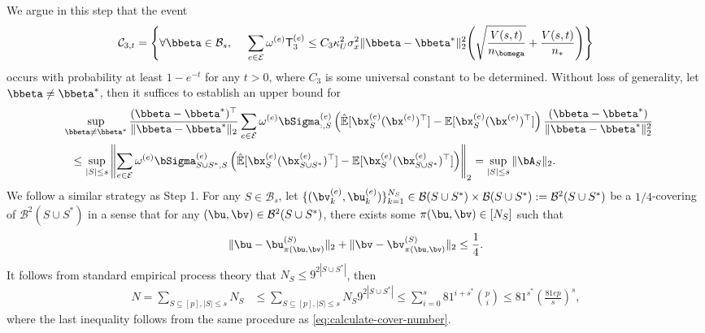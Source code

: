 \documentclass[10pt]{article}
\numberwithin{equation}{section}
\begin{document}
 We argue in this step that the event
\begin{align}
\label{eq:low-dim-id-bound3}
	\mathcal{C}_{3,t} = \left\{ \forall \bbeta \in \mathcal{B}_s, ~~~~ \sum_{e\in \mathcal{E}} \omega^{(e)} \mathsf{T}_3^{(e)} \le C_3\kappa_U^2 \sigma_x^2  \|\bbeta - \bbeta^*\|_2^2 \Bigg(\sqrt{\frac{V(s,t)}{n_{\bomega}}} + \frac{V(s,t)}{n_*}\Bigg) \right\}	
\end{align} occurs with probability at least $1-e^{-t}$ for any $t>0$, where $C_3$ is some universal constant to be determined. Without loss of generality, let $\bbeta \neq \bbeta^*$, then it suffices to establish an upper bound for
\begin{align}
\label{eq:step3-sup-argument-1}
\begin{split}
&~\sup_{\bbeta \neq \bbeta^*} \frac{(\bbeta - \bbeta^*)^\top}{\|\bbeta - \bbeta^*\|_2} \sum_{e\in \mathcal{E}} \omega^{(e)} \bSigma_{:,S}^{(e)} \left(\hat{\mathbb{E}}[\bx_S^{(e)} (\bx^{(e)})^\top] - \mathbb{E}[\bx_S^{(e)} (\bx^{(e)})^\top] \right) \frac{(\bbeta - \bbeta^*)}{\|\bbeta - \bbeta^*\|_2^2} \\
&~~~\le \sup_{|S| \le s} \left\| \sum_{e\in \mathcal{E}} \omega^{(e)} \bSigma_{S\cup S^*,S}^{(e)} \left(\hat{\mathbb{E}}[\bx_S^{(e)} (\bx^{(e)}_{S\cup S^*})^\top] - \mathbb{E}[\bx_S^{(e)} (\bx^{(e)}_{S\cup S^*})^\top] \right) \right\|_2 = \sup_{|S| \le s} \|\bA_S\|_2.
\end{split}
\end{align}
We follow a similar strategy as {\sc Step 1}. For any $S\in \mathcal{B}_s$, let $\{(\bv^{(e)}_{k}, \bu^{(e)}_{k})\}_{k=1}^{N_S} \in \mathcal{B}(S\cup S^*) \times \mathcal{B}(S\cup S^*) := \mathcal{B}^2(S\cup S^*)$ be a $1/4$-covering of $\mathcal{B}^2(S\cup S^*)$ in a sense that for any $(\bu, \bv) \in \mathcal{B}^2(S\cup S^*)$, there exists some $\pi(\bu, \bv) \in [N_S]$ such that
\begin{align*}
    \|\bu - \bu^{(S)}_{\pi(\bu, \bv)}\|_{2} + \|\bv - \bv^{(S)}_{\pi(\bu, \bv)}\|_{2} \le \frac{1}{4}.
\end{align*} It follows from standard empirical process theory that $N_S \le 9^{2|S\cup S^*|}$, then
\begin{align*}
    N = \sum_{S\subseteq [p], |S| \le s} N_S &\le \sum_{S\subseteq [p], |S| \le s} N_S 9^{2|S\cup S^*|} \le \sum_{i=0}^{s} 81^{i + s^*} \binom{p}{i}
    \le 81^{s^*} \left(\frac{81ep}{s}\right)^s,
\end{align*} where the last inequality follows from the same procedure as \eqref{eq:calculate-cover-number}.
\end{document}
